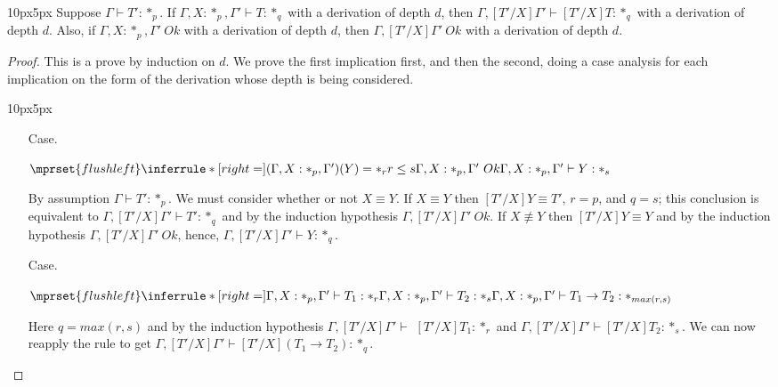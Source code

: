 \begin{lemma}
  \begin{changemargin}{10px}{5px}\noindent
  Suppose $\Gamma \vdash T':*_p$.  If $\Gamma,X:*_p,\Gamma' \vdash T:*_q$ 
  with a derivation of depth $d$, then $\Gamma,[T'/X]\Gamma' \vdash [T'/X]T:*_q$
  with a derivation of depth $d$.
  Also, if $\Gamma,X:*_p,\Gamma'\ Ok$ with a derivation of depth $d$, then 
  $\Gamma,[T'/X]\Gamma'\ Ok$ with a derivation of depth $d$.
  \end{changemargin}
  \label{lemma:substitution_for_kinding_ssf}
\end{lemma}
\begin{proof}
  This is a prove by induction on $d$.  We prove the first implication first, and then the 
  second, doing a case analysis for each implication on the form of the derivation whose depth 
  is being considered. 
  \vspace{-25px}
  \begin{changemargin}{10px}{5px}\noindent
  \begin{itemize}
  \item[Case.]\ \\
    \begin{center}
      \begin{math}
        $$\mprset{flushleft}
        \inferrule* [right=] {
          (\Gamma,X:*_p,\Gamma')(Y) = *_r
          \\
          r \leq s
          \\
          \Gamma,X:*_p,\Gamma'\ Ok
        }{\Gamma,X:*_p,\Gamma' \vdash Y : *_s}
      \end{math}
    \end{center}
    By assumption $\Gamma \vdash T':*_p$.  We must consider whether or not 
    $X \equiv Y$.  If $X \equiv Y$ then $[T'/X]Y \equiv T'$, $r = p$, and $q = s$; 
    this conclusion is equivalent to $\Gamma,[T'/X]\Gamma' \vdash T':*_q$ and
    by the induction hypothesis $\Gamma,[T'/X]\Gamma'\ Ok$.  
    If $X \not \equiv Y$ then $[T'/X]Y \equiv Y$ and 
    by the induction hypothesis $\Gamma,[T'/X]\Gamma'\ Ok$, hence,
    $\Gamma,[T'/X]\Gamma' \vdash Y:*_q$.\\
    
  \item[Case.]\ \\
    \begin{center}
      \begin{math}
        $$\mprset{flushleft}
        \inferrule* [right=] {
          \Gamma,X:*_p,\Gamma' \vdash T_1 : *_r
          \\
          \Gamma,X:*_p,\Gamma' \vdash T_2 : *_s
        }{\Gamma,X:*_p,\Gamma' \vdash T_1 \rightarrow T_2 : *_{max(r,s)}}
      \end{math}
    \end{center}
    Here $q = max(r,s)$ and by the induction hypothesis $\Gamma,[T'/X]\Gamma' \vdash $
    $[T'/X]T_1:*_r$ and $\Gamma,[T'/X]\Gamma' \vdash [T'/X]T_2:*_s$.
    We can now reapply the rule to get 
    $\Gamma,[T'/X]\Gamma' \vdash [T'/X](T_1 \rightarrow T_2) : *_q$.\\
    

\end{itemize}
\end{changemargin}
\end{proof}
